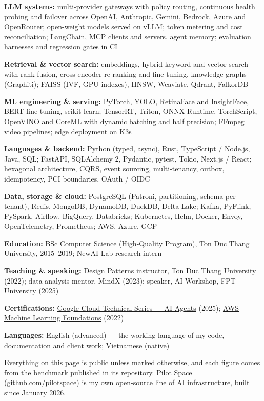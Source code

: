 \documentclass[10pt,a4paper,ragged2e,withhyper]{altacv}
\newcommand{\skillrow}[2]{\noindent\small\textbf{#1:} #2\par\vspace{3pt}}
\begin{document}
\skillrow{LLM systems}{multi-provider gateways with policy routing, continuous health probing and failover across OpenAI, Anthropic, Gemini, Bedrock, Azure and OpenRouter; open-weight models served on vLLM; token metering and cost reconciliation; LangChain, MCP clients and servers, agent memory; evaluation harnesses and regression gates in CI}
\skillrow{Retrieval \& vector search}{embeddings, hybrid keyword-and-vector search with rank fusion, cross-encoder re-ranking and fine-tuning, knowledge graphs (Graphiti); FAISS (IVF, GPU indexes), HNSW, Weaviate, Qdrant, FalkorDB}
\skillrow{ML engineering \& serving}{PyTorch, YOLO, RetinaFace and InsightFace, BERT fine-tuning, scikit-learn; TensorRT, Triton, ONNX Runtime, TorchScript, OpenVINO and CoreML with dynamic batching and half precision; FFmpeg video pipelines; edge deployment on K3s}
\skillrow{Languages \& backend}{Python (typed, async), Rust, TypeScript / Node.js, Java, SQL; FastAPI, SQLAlchemy 2, Pydantic, pytest, Tokio, Next.js / React; hexagonal architecture, CQRS, event sourcing, multi-tenancy, outbox, idempotency, PCI boundaries, OAuth / OIDC}
\skillrow{Data, storage \& cloud}{PostgreSQL (Patroni, partitioning, schema per tenant), Redis, MongoDB, DynamoDB, DuckDB, Delta Lake; Kafka, PyFlink, PySpark, Airflow, BigQuery, Databricks; Kubernetes, Helm, Docker, Envoy, OpenTelemetry, Prometheus; AWS, Azure, GCP}


\skillrow{Education}{BSc Computer Science (High-Quality Program), Ton Duc Thang University, 2015--2019; NewAI Lab research intern}
\skillrow{Teaching \& speaking}{Design Patterns instructor, Ton Duc Thang University (2022); data-analysis mentor, MindX (2023); speaker, AI Workshop, FPT University (2025)}
\skillrow{Certifications}{\href{https://www.credential.net/f16b9afc-1d7a-4427-b7e3-f0bf76cd75ae}{Google Cloud Technical Series --- AI Agents} (2025); \href{https://s3-us-west-2.amazonaws.com/udacity-printer/production/certificates/0ad10fbf-13db-4f96-b196-a108e3bff2b2.pdf}{AWS Machine Learning Foundations} (2022)}
\skillrow{Languages}{English (advanced) --- the working language of my code, documentation and client work; Vietnamese (native)}

\clearpage
\normalsize
\justifying


\noindent Everything on this page is public unless marked otherwise, and each figure comes from the benchmark published in its repository. Pilot Space (\href{https://github.com/pilotspace}{github.com/pilotspace}) is my own open-source line of AI infrastructure, built since January 2026.
\end{document}
